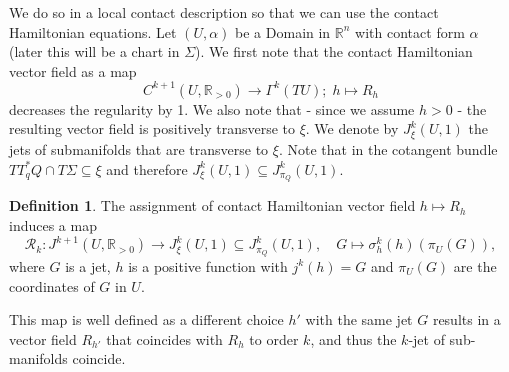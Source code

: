 \documentclass{amsart}
\newcommand{\Rcal}{{\mathcal{R}}}
\newcommand{\RR}{\mathbb{R}}
\theoremstyle{definition}
\newtheorem{definition}[proposition]{Definition}
\theoremstyle{remark}
\numberwithin{equation}{section}
\begin{document}
We do so in a local contact description so that we can use the contact Hamiltonian equations. Let $(U,\alpha)$ be a Domain in $\RR^n$ with contact form $\alpha$ (later this will be a chart in $\Sigma$). We first note that the contact Hamiltonian vector field as a map 
$$C^{k+1}(U,\RR_{>0})\to \Gamma^{k}(TU);\; h\mapsto R_h$$ 
decreases the regularity by 1. We also note that - since we assume $h>0$ - the resulting vector field is positively transverse to $\xi$. We denote by $J_{\xi}^k(U,1)$ the jets of submanifolds that are transverse to $\xi$. Note that in the cotangent bundle $TT^*_qQ\cap T\Sigma\subseteq \xi$ and therefore $J_{\xi}^k(U,1)\subseteq J_{\pi_Q}^k(U,1)$.  
\begin{definition}\label{def:jetcontacthamiltonian}
    The assignment of contact Hamiltonian vector field $h\mapsto R_h$ induces a map 
    $$\Rcal_k\colon J^{k+1}(U,\RR_{>0}) \longrightarrow J_\xi^k(U,1)\subseteq J_{\pi_Q}^k(U,1),\quad G\mapsto \sigma^k_h(h)(\pi_U(G)),$$
    where $G$ is a jet, $h$ is a positive function with $j^k(h)=G$ and $\pi_U(G)$ are the coordinates of $G$ in $U$.
\end{definition}
This map is well defined as a different choice $h'$ with the same jet $G$ results in a vector field $R_{h'}$ that coincides with $R_h$ to order $k$, and thus the $k$-jet of sub-manifolds coincide. 
\end{document}
